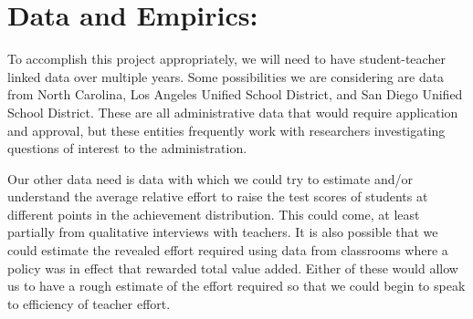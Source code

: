 \documentclass[letterpaper,12pt]{article}
\begin{document}
\section{Data and Empirics:}

To accomplish this project appropriately, we will need to have student-teacher linked data over multiple years. Some possibilities we are considering are data from North Carolina, Los Angeles Unified School District, and San Diego Unified School District. These are all administrative data that would require application and approval, but these entities frequently work with researchers investigating questions of interest to the administration.

Our other data need is data with which we could try to estimate and/or understand the average relative effort to raise the test scores of students at different points in the achievement distribution. This could come, at least partially from qualitative interviews with teachers. It is also possible that we could estimate the revealed effort required using data from classrooms where a policy was in effect that rewarded total value added. Either of these would allow us to have a rough estimate of the effort required so that we could begin to speak to efficiency of teacher effort.




    
\end{document}
